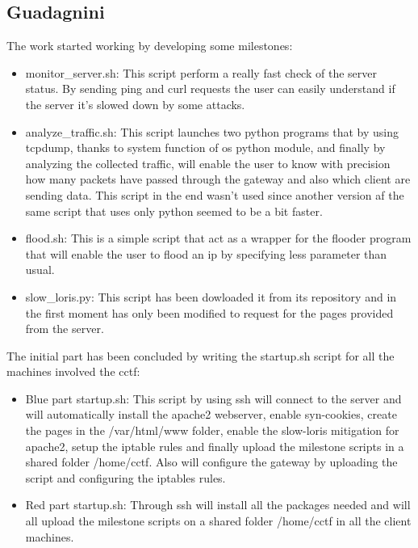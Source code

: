\documentclass[14pt]{article}
\begin{document}
\subsection{Guadagnini}
The work started working by developing some milestones: 
\begin{itemize}
	\item monitor\_server.sh: This script perform a really fast check of the server status. By sending ping and curl requests the user can easily understand if the server it's slowed down by some attacks.
	
	\item analyze\_traffic.sh: This script launches two python programs that by using tcpdump, thanks to system function of os python module, and finally by analyzing the collected traffic, will enable the user to know with precision how many packets have passed through the gateway and also which client are sending data. This script in the end wasn't used since another version af the same script that uses only python seemed to be a bit faster.
	
	\item flood.sh: This is a simple script that act as a wrapper for the flooder program that will enable the user to flood an ip by specifying less parameter than usual.
	
	\item slow\_loris.py: This script has been dowloaded it from its repository and in the first moment has only been modified to request for the pages provided from the server.
\end{itemize}

The initial part has been concluded by writing the startup.sh script for all the machines involved the cctf:
\begin{itemize}
	\item Blue part startup.sh: This script by using ssh will connect to the server and will automatically install the apache2 webserver, enable syn-cookies, create the pages in the /var/html/www folder, enable the slow-loris mitigation for apache2, setup the iptable rules and finally upload the milestone scripts in a shared folder /home/cctf. Also will configure the gateway by uploading the script and configuring the iptables rules.
	
	\item Red part startup.sh: Through ssh will install all the packages needed and will all upload the milestone scripts on a shared folder /home/cctf in all the client machines.
\end{itemize}
\end{document}
